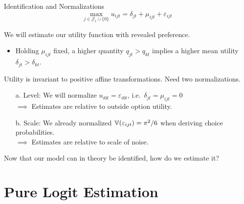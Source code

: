 \documentclass[aspectratio=169,t,11pt,table]{beamer}
\begin{document}
\begin{frame}{Identification and Normalizations}
    \vspace{-\baselineskip}
    \begin{equation*}
        \max_{j \in \mathcal{J}_t \cup \{0\}} u_{ijt} = \delta_{jt} + \mu_{ijt} + \varepsilon_{ijt}
    \end{equation*}
    \vspace{-0.5\baselineskip}
    \begin{wideitemize}
        \item We will estimate our utility function with \alert{revealed preference}.
        \begin{itemize}
            \item Holding $\mu_{ijt}$ fixed, a higher quantity $q_{jt} > q_{kt}$ implies a higher mean utility $\delta_{jt} > \delta_{kt}$.
        \end{itemize}
        \pause
        \item Utility is invariant to positive affine transformations. Need two normalizations.
        \pause
        \begin{enumerate}
            \item[a.] \alert{Level}: We will normalize $u_{i0t} = \varepsilon_{i0t}$, i.e.\ $\delta_{jt} = \mu_{ijt} = 0$ \\ $\implies$ Estimates are relative to outside option utility.
            \pause
            \item[b.] \alert{Scale}: We already normalized $\mathbb{V}(\varepsilon_{ijt}) = \pi^2 / 6$ when deriving choice probabilities. \\ $\implies$ Estimates are relative to scale of noise.
        \end{enumerate}
        \pause
        \item Now that our model can in theory be identified, how do we estimate it?
    \end{wideitemize}
\end{frame}

\section{Pure Logit Estimation}
\end{document}
